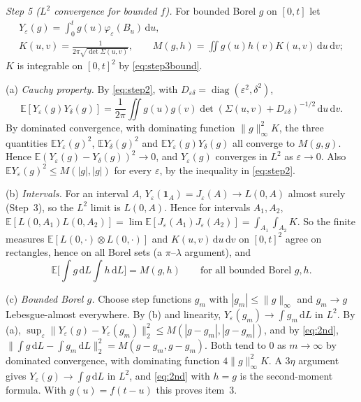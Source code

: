\documentclass[11pt]{article}
\theoremstyle{remark}
\theoremstyle{definition}
\newcommand{\E}{\mathbb{E}}
\newcommand{\dd}{\,\mathrm{d}}
\begin{document}
\emph{Step 5 ($L^2$ convergence for bounded $f$).} For bounded Borel $g$ on $[0,t]$ let
\begin{gather*}
Y_\varepsilon(g)=\int_0^t g(u)\varphi_\varepsilon(B_u)\dd u,\\ K(u,v)=\frac{1}{2\pi\sqrt{\det\Sigma(u,v)}},\qquad M(g,h)=\iint g(u)h(v)K(u,v)\dd u\dd v ;
\end{gather*}
$K$ is integrable on $[0,t]^2$ by \eqref{eq:step3bound}.

(a) \emph{Cauchy property.} By \eqref{eq:step2}, with $D_{\varepsilon\delta}=\operatorname{diag}(\varepsilon^2,\delta^2)$,
\[
\E[Y_\varepsilon(g)Y_\delta(g)]=\frac1{2\pi}\iint g(u)g(v)\det(\Sigma(u,v)+D_{\varepsilon\delta})^{-1/2}\dd u\dd v .
\] By dominated convergence, with dominating function $\|g\|_\infty^2K$, the three quantities $\E Y_\varepsilon(g)^2$, $\E Y_\delta(g)^2$ and $\E Y_\varepsilon(g)Y_\delta(g)$ all converge to $M(g,g)$. Hence $\E(Y_\varepsilon(g)-Y_\delta(g))^2\to0$, and $Y_\varepsilon(g)$ converges in $L^2$ as $\varepsilon\to0$. Also $\E Y_\varepsilon(g)^2\le M(|g|,|g|)$ for every $\varepsilon$, by the inequality in \eqref{eq:step2}.

(b) \emph{Intervals.} For an interval $A$, $Y_\varepsilon(\mathbf 1_A)=J_\varepsilon(A)\to L(0,A)$ almost surely (Step~3), so the $L^2$ limit is $L(0,A)$. Hence for intervals $A_1,A_2$, $\E[L(0,A_1)L(0,A_2)]=\lim\E[J_\varepsilon(A_1)J_\varepsilon(A_2)]=\int_{A_1}\int_{A_2}K$. So the finite measures $\E[L(0,\cdot)\otimes L(0,\cdot)]$ and $K(u,v)\dd u\dd v$ on $[0,t]^2$ agree on rectangles, hence on all Borel sets (a $\pi$--$\lambda$ argument), and
\begin{equation}\label{eq:2nd}
\E\Big[\int g\dd L\int h\dd L\Big]=M(g,h)\qquad\text{for all bounded Borel } g,h .
\end{equation}

(c) \emph{Bounded Borel $g$.} Choose step functions $g_m$ with $|g_m|\le\|g\|_\infty$ and $g_m\to g$ Lebesgue-almost everywhere. By (b) and linearity, $Y_\varepsilon(g_m)\to\int g_m\dd L$ in $L^2$. By (a), $\sup_\varepsilon\|Y_\varepsilon(g)-Y_\varepsilon(g_m)\|_2^2\le M(|g-g_m|,|g-g_m|)$, and by \eqref{eq:2nd}, $\|\int g\dd L-\int g_m\dd L\|_2^2=M(g-g_m,g-g_m)$. Both tend to $0$ as $m\to\infty$ by dominated convergence, with dominating function $4\|g\|_\infty^2K$. A $3\eta$ argument gives $Y_\varepsilon(g)\to\int g\dd L$ in $L^2$, and \eqref{eq:2nd} with $h=g$ is the second-moment formula. With $g(u)=f(t-u)$ this proves item~3.
\end{document}
